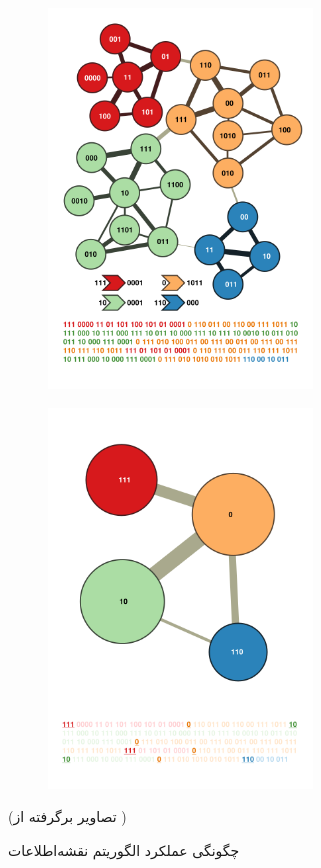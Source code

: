 \begin{figure}
\begin{subfigure}{.5\textwidth}
    \includegraphics[width=7cm]{infomap3.png}
    \caption{}
    \label{fig:infomap_c}
  \end{subfigure}
  \begin{subfigure}{.5\textwidth}
    \centering
    \includegraphics[width=7cm]{infomap4.png}
    \caption{}
    \label{fig:infomap_d}
  \end{subfigure}
  \caption{چگونگی عملکرد الگوریتم نقشه‌اطلاعات}
  \begin{center}
  (تصاویر برگرفته  از \cite{rosvall2010map})
  \end{center}
  \label{fig:infomap}
\end{figure}

